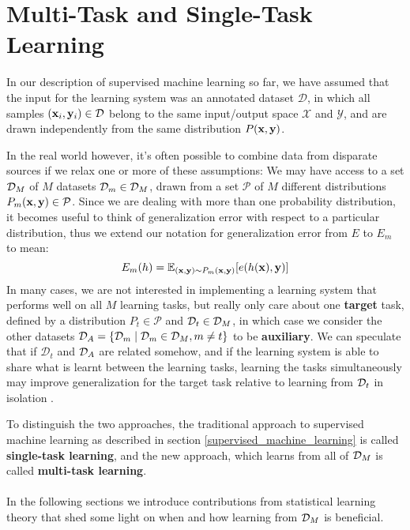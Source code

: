 \section{Multi-Task and Single-Task Learning}
\label{multiTaskAndSingleTaskLearning}

In our description of supervised machine learning so far, we have assumed that the input for the learning system was an annotated dataset $\mathcal{D}$, in which all samples $(\mathbf{x}_i, \mathbf{y}_i) \in \mathcal{D}$ belong to the same input/output space $\mathcal{X}$ and $\mathcal{Y}$, and are drawn independently from the same distribution $P(\mathbf{x}, \mathbf{y})$.

In the real world however, it's often possible to combine data from disparate sources if we relax one or more of these assumptions: We may have access to a set $\mathcal{D}_M$ of $M$ datasets $\mathcal{D}_m \in \mathcal{D}_M$, drawn from a set $\mathcal{P}$ of $M$ different distributions $P_m(\mathbf{x}, \mathbf{y}) \in \mathcal{P}$. Since we are dealing with more than one probability distribution, it becomes useful to think of generalization error with respect to a particular distribution, thus we extend our notation for generalization error from $E$ to $E_m$ to mean:
$$
E_m(h) = \mathbb{E}_{(\mathbf{x},\mathbf{y}) \sim P_m(\mathbf{x},\mathbf{y})}[e(h(\mathbf{x}),\mathbf{y})]
$$
In many cases, we are not interested in implementing a learning system that performs well on all $M$ learning tasks, but really only care about one \textbf{target} task, defined by a distribution $P_t \in \mathcal{P}$ and $\mathcal{D}_t \in \mathcal{D}_M$, in which case we consider the other datasets $\mathcal{D}_A = \{\mathcal{D}_m \mid \mathcal{D}_m \in \mathcal{D}_M, m \neq t\}$ to be \textbf{auxiliary}. We can speculate that if $\mathcal{D}_t$ and $\mathcal{D}_A$ are related somehow, and if the learning system is able to share what is learnt between the learning tasks, learning the tasks simultaneously may improve generalization for the target task relative to learning from $\mathcal{D}_t$ in isolation \citep{caruana1997}.

To distinguish the two approaches, the traditional approach to supervised machine learning as described in section \ref{supervised_machine_learning} is called \textbf{single-task learning}, and the new approach, which learns from all of $\mathcal{D}_M$ is called \textbf{multi-task learning}.
\\\\
In the following sections we introduce contributions from statistical learning theory that shed some light on when and how learning from $\mathcal{D}_M$ is beneficial.